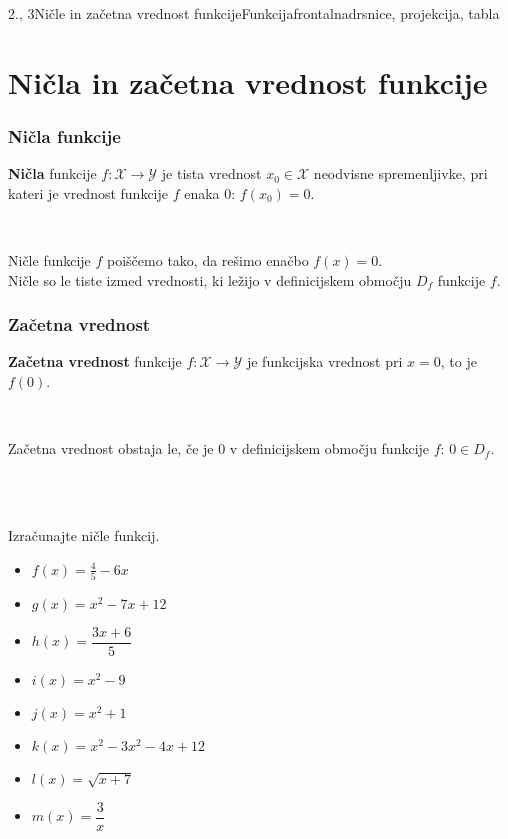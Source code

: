 \begin{priprava}{2., 3}{}{Ničle in začetna vrednost funkcije}{Funkcija}{frontalna}{drsnice, projekcija, tabla}


    \section{Ničla in začetna vrednost funkcije}

    \subsubsection*{Ničla funkcije}
        \textbf{Ničla} funkcije $f:\mathcal{X}\to\mathcal{Y}$ je tista vrednost $x_0\in\mathcal{X}$ neodvisne spremenljivke, 
        pri kateri je vrednost funkcije $f$ enaka $0$: $f(x_0)=0$.

        ~

        Ničle funkcije $f$ poiščemo tako, da rešimo enačbo $f(x)=0$. \\
        Ničle so le tiste izmed vrednosti, ki ležijo v definicijskem območju $D_f$ funkcije $f$.

        
    \subsubsection*{Začetna vrednost}
        \textbf{Začetna vrednost} funkcije $f:\mathcal{X}\to\mathcal{Y}$ je funkcijska vrednost pri $x=0$, to je $f(0)$.

        ~

        Začetna vrednost obstaja le, če je $0$ v definicijskem območju funkcije $f$: $0\in D_f$.

        
~\\~\\




    \begin{naloga}
        Izračunajte ničle funkcij.
                \begin{multicols}{2}

            \begin{itemize}
                \item $f(x)=\frac{4}{5}-6x$ 
                \item $g(x)=x^2-7x+12$ 
                \item $h(x)=\dfrac{3x+6}{5}$ 
                \item $i(x)=x^2-9$ 
                \item $j(x)=x^2+1$ 
                \item $k(x)=x^2-3x^2-4x+12$ 
                \item $l(x)=\sqrt{x+7}$ 
                \item $m(x)=\dfrac{3}{x}$ 
            \end{itemize}
        \end{multicols}
    \end{naloga}



\end{priprava}
